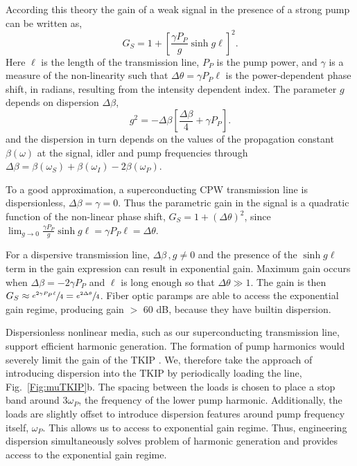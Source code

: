 According this theory \cite{Stolen1982} the gain of a weak signal in the presence of a strong pump can be written as,
\begin{equation}
	G_S = 1+ \left[ \frac{\gamma P_P}{g} \sinh g \ell \right]^2.
\end{equation}
Here $\ell$ is the length of the transmission line, $P_P$ is the pump power, and $\gamma$ is a measure of the non-linearity such that $\Delta \theta = \gamma P_P \ell$ is the power-dependent phase shift, in radians, resulting from the intensity dependent index. The parameter $g$ depends on dispersion $\Delta \beta$,
\begin{equation}
	g^2 = - \Delta \beta \left[ \frac{\Delta \beta}{4} + \gamma P_P\right].
\end{equation}
and the dispersion in turn depends on the values of the propagation constant $\beta(\omega)$ at the signal, idler and pump frequencies through $\Delta \beta = \beta(\omega_S) + \beta(\omega_I) -2\beta(\omega_P)$.


To a good approximation, a superconducting CPW transmission line is dispersionless, $\Delta \beta = \gamma = 0$. Thus the parametric gain in the signal is a quadratic function of the non-linear phase shift, $G_S = 1 + (\Delta \theta)^2$, since  $ \lim_{g \to 0} \frac{\gamma P_P}{g} \sinh g \ell =  \gamma P_P \ell = \Delta \theta$.

  
For a dispersive transmission line, $\Delta \beta \, , g \neq 0 $ and the presence of the $\sinh  g \ell$ term in the gain
expression can result in exponential gain. Maximum gain occurs when $\Delta \beta = -2 \gamma P_P$ and $\ell$  is long enough so that $\Delta \theta \gg 1$. The gain is then $G_S \approx \sfrac{e^{2\gamma P_P \ell}}{4} = \sfrac{e^{2\Delta \theta}}{4}$. Fiber optic paramps are able to access the exponential gain regime, producing gain $>$ 60 dB, because they have builtin dispersion.  

Dispersionless nonlinear media, such as our superconducting transmission line, support efficient harmonic generation. The formation of pump harmonics would severely limit the gain of the TKIP \cite{Landauer1960}. We, therefore take the approach of introducing  dispersion into  the TKIP by periodically loading the line, Fig.~\ref{Fig:muTKIP}b. The spacing between the loads is chosen to place a stop band around $3\omega_P$, the frequency of the lower pump harmonic. Additionally, the loads are slightly offset to introduce dispersion features around pump frequency itself, $\omega_P$. This allows us to access to exponential gain regime. Thus, engineering dispersion simultaneously solves problem of harmonic generation and provides access to the exponential gain regime.   


